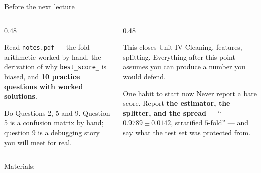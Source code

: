 \documentclass[aspectratio=169]{beamer}
\begin{document}
\begin{frame}[shrink=3]{Before the next lecture}
  \begin{columns}[T]
    \begin{column}{0.48\textwidth}
      \begin{block}{Read}
        \texttt{notes.pdf} --- the fold arithmetic worked by hand, the
        derivation of why \texttt{best\_score\_} is biased, and \textbf{10
        practice questions with worked solutions}.
      \end{block}
      \begin{block}{Do}
        Questions 2, 5 and 9. Question 5 is a confusion matrix by hand;
        question 9 is a debugging story you will meet for real.
      \end{block}
    \end{column}
    \begin{column}{0.48\textwidth}
      \begin{exampleblock}{This closes Unit IV}
        Cleaning, features, splitting. Everything after this point assumes
        you can produce a number you would defend.
      \end{exampleblock}
      \begin{alertblock}{One habit to start now}
        Never report a bare score. Report \textbf{the estimator, the splitter,
        and the spread} --- ``$0.9789 \pm 0.0142$, stratified $5$-fold'' ---
        and say what the test set was protected from.
      \end{alertblock}
    \end{column}
  \end{columns}
  \begin{center}
    \small Materials: \texttt{\AMLRepoURL}
  \end{center}
  \slidesources{\AMLUnitIVSources}
\end{frame}
\end{document}
